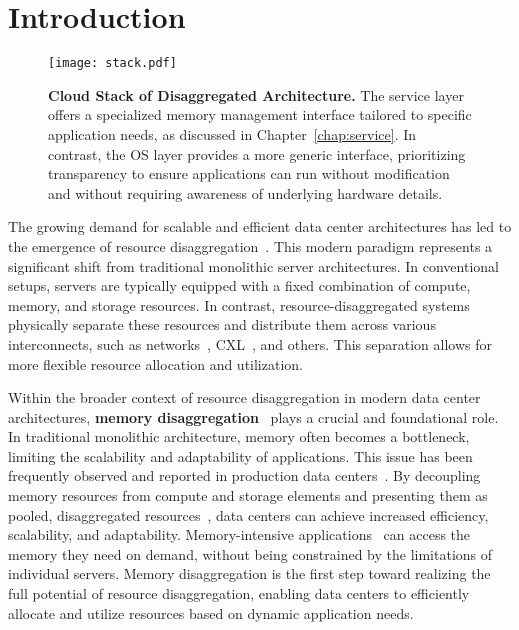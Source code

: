 \chapter{Introduction}
\label{chap:introduction}
\begin{figure}[t]
    \centering
    \texttt{[image: stack.pdf]}
      \caption[Cloud Stack of Disaggregated Architecture]{\textbf{Cloud Stack of Disaggregated Architecture.} The service layer offers a specialized memory management interface tailored to specific application needs, as discussed in Chapter~\ref{chap:service}. In contrast, the OS layer provides a more generic interface, prioritizing transparency to ensure applications can run without modification and without requiring awareness of underlying hardware details.} 
      \label{fig:stack}
\end{figure}
The growing demand for scalable and efficient data center architectures has led to the emergence of resource disaggregation~\cite{mind, legoos, disagg, memdisagg1, memdisagg2, memdisagg3, memdisagg4, memdisagg5, memdisagg6}. This modern paradigm represents a significant shift from traditional monolithic server architectures. In conventional setups, servers are typically equipped with a fixed combination of compute, memory, and storage resources. In contrast, resource-disaggregated systems physically separate these resources and distribute them across various interconnects, such as networks~\cite{disagg, legoos, mind}, CXL~\cite{cxl, cxlasic}, and others. This separation allows for more flexible resource allocation and utilization.

Within the broader context of resource disaggregation in modern data center architectures, \textbf{memory disaggregation}~\cite{memdisagg1, memdisagg2, memdisagg3, memdisagg4, memdisagg5, memdisagg6} plays a crucial and foundational role. In traditional monolithic architecture, memory often becomes a bottleneck, limiting the scalability and adaptability of applications. This issue has been frequently observed and reported in production data centers~\cite{memory1, memory2, memory3, memory4, memory5, memory6, memory7, memory8, memory9, memory10}. By decoupling memory resources from compute and storage elements and presenting them as pooled, disaggregated resources~\cite{pool1, pool2}, data centers can achieve increased efficiency, scalability, and adaptability. Memory-intensive applications~\cite{redis, ramcloud, sparkmemory} can access the memory they need on demand, without being constrained by the limitations of individual servers. Memory disaggregation is the first step toward realizing the full potential of resource disaggregation, enabling data centers to efficiently allocate and utilize resources based on dynamic application needs. 


